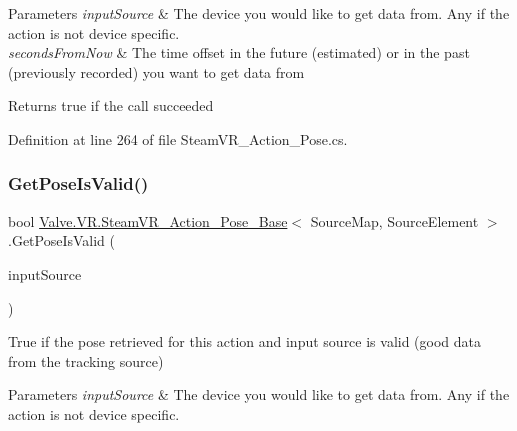 \begin{DoxyParams}{Parameters}
{\em input\+Source} & The device you would like to get data from. Any if the action is not device specific.\\
\hline
{\em seconds\+From\+Now} & The time offset in the future (estimated) or in the past (previously recorded) you want to get data from\\
\hline
\end{DoxyParams}
\begin{DoxyReturn}{Returns}
true if the call succeeded
\end{DoxyReturn}


Definition at line 264 of file Steam\+V\+R\+\_\+\+Action\+\_\+\+Pose.\+cs.

\mbox{\label{class_valve_1_1_v_r_1_1_steam_v_r___action___pose___base_ae83ce8dae5f87c106ccbd0860c8f1181}} 
\subsubsection{\texorpdfstring{GetPoseIsValid()}{GetPoseIsValid()}}
{\footnotesize\ttfamily bool \mbox{\hyperlink{class_valve_1_1_v_r_1_1_steam_v_r___action___pose___base}{Valve.\+V\+R.\+Steam\+V\+R\+\_\+\+Action\+\_\+\+Pose\+\_\+\+Base}}$<$ Source\+Map, Source\+Element $>$.Get\+Pose\+Is\+Valid (\begin{DoxyParamCaption}\item[{\mbox{\hyperlink{namespace_valve_1_1_v_r_a82e5bf501cc3aa155444ee3f0662853f}{Steam\+V\+R\+\_\+\+Input\+\_\+\+Sources}}}]{input\+Source }\end{DoxyParamCaption})}



True if the pose retrieved for this action and input source is valid (good data from the tracking source) 


\begin{DoxyParams}{Parameters}
{\em input\+Source} & The device you would like to get data from. Any if the action is not device specific.\\
\hline
\end{DoxyParams}


